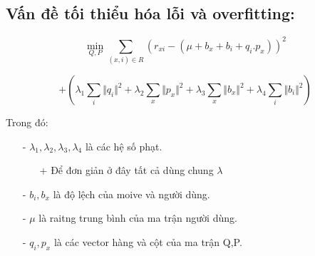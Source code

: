 \documentclass[a0,portrait,11pt]{a0poster}
\begin{document}
\begin{multicols}{2}
\begin{mybox}
\subsection*{Vấn đề tối thiểu hóa lỗi và overfitting:}
\begin{minipage}[c]{0.6\linewidth}
\begin{flushleft}
\begin{displaymath}
\displaystyle \min_{Q,P} \sum_{(x,i)\in R}(r_{xi} - (\mu + b_x + b_i + q_i.p_x))^2
\end{displaymath}
\end{flushleft}
\begin{center}
\begin{displaymath}
\displaystyle
+ (\lambda_1\sum_{i}\Vert q_i \Vert^{2} + \lambda_2\sum_x\Vert p_x \Vert^2 + \lambda_3\sum_x\Vert b_x \Vert^2 + \lambda_4\sum_i\Vert b_i \Vert^2)
\end{displaymath}
\end{center}
\end{minipage}
\begin{minipage}[c]{0.4\linewidth}
Trong đó:
\begin{itemize}
\item[-] $\lambda_1,\lambda_2,\lambda_3,\lambda_4$ là các hệ số phạt.
\begin{itemize}
\item[+] Để đơn giản ở đây tất cả dùng chung $\lambda$
\end{itemize}
\item[-] $b_i,b_x$ là độ lệch của moive và người dùng.
\item[-] $\mu$ là raitng trung bình của ma trận người dùng.
\item[-] $q_i,p_x$ là các vector hàng và cột của ma trận Q,P.
\end{itemize}
\end{minipage}
\end{mybox}

\nocite{*} %

\end{multicols}
\end{document}
